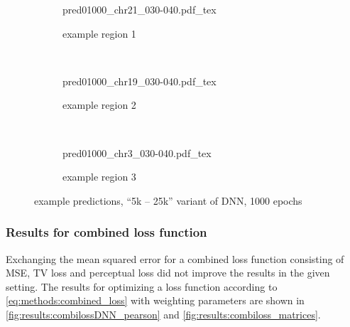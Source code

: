 \begin{figure}[p]
    \begin{subfigure}{\textwidth}
        \centering
        \scriptsize
        {pred01000_chr21_030-040.pdf_tex}
        \caption{example  region 1} \label{fig:results:25k5_r1}
    \end{subfigure}\\[6mm]
    \begin{subfigure}{\textwidth}
        \centering
        \scriptsize
        {pred01000_chr19_030-040.pdf_tex}
        \caption{example region 2} \label{fig:results:25k5_r2}
    \end{subfigure}\\[6mm]
    \begin{subfigure}{\textwidth}
        \centering
        \scriptsize
        {pred01000_chr3_030-040.pdf_tex}
        \caption{example region 3} \label{fig:results:25k5_r3}
    \end{subfigure}
    \caption{example predictions, ``5k -- 25k'' variant of DNN, 1000 epochs} \label{fig:results:25k5_matrices}
\end{figure}

\subsubsection{Results for combined loss function} \label{sec:results:loss_functions}
Exchanging the mean squared error for a combined loss function consisting of MSE, TV loss and perceptual loss did not improve the results in the given setting.
The results for optimizing a loss function according to \cref{eq:methods:combined_loss} with weighting parameters 
are shown in \cref{fig:results:combilossDNN_pearson} and \ref{fig:results:combiloss_matrices}.

